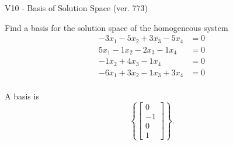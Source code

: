 \begin{exercise}
  \begin{exerciseTitle}V10 - Basis of Solution Space (ver. 773)\end{exerciseTitle}
  \begin{exerciseStatement}
    Find a basis for the solution space of the homogeneous system 
\begin{align*}
 -3 x_ 1 -5 x_ 2 + 3 x_ 3 -5 x_ 4 &= 0  \\ 
  5 x_ 1 -1 x_ 2 -2 x_ 3 -1 x_ 4 &= 0  \\ 
  -1 x_ 2 + 4 x_ 3 -1 x_ 4 &= 0  \\ 
  -6 x_ 1 + 3 x_ 2 -1 x_ 3 + 3 x_ 4 &= 0  \\ 
 \end{align*}


 
  \end{exerciseStatement}

  \begin{exerciseAnswer}
   A basis is   
\[\left\{\left[\begin{array}{c}
0 \\
-1 \\
0 \\
1
\end{array}\right]\right\}.\]

  


  \end{exerciseAnswer}
\end{exercise}
